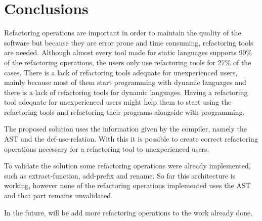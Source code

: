 
% 
% 

\section{Conclusions}


Refactoring operations are important in order to maintain the quality of the software but because they are error prone and time consuming, refactoring tools are needed.
Although almost every tool made for static languages supports 90\% of the refactoring operations, the users only use refactoring tools for 27\% of the cases. 
There is a lack of refactoring tools adequate for unexperienced users, mainly because most of them start programming with dynamic languages and there is a lack of refactoring tools for dynamic languages.
Having a refactoring tool adequate for unexperienced users might help them to start using the refactoring tools and refactoring their programs alongside with programming.

The proposed solution uses the information given by the compiler, namely the AST and the def-use-relation. With this it is possible to create correct refactoring operations necessary for a refactoring tool to unexperienced users.


To validate the solution some refactoring operations were already implemented, such as extract-function, add-prefix and rename. 
So far this architecture is working, however none of the refactoring operations implemented uses the AST and that part remains unvalidated.

In the future, will be add more refactoring operations to the work already done.







